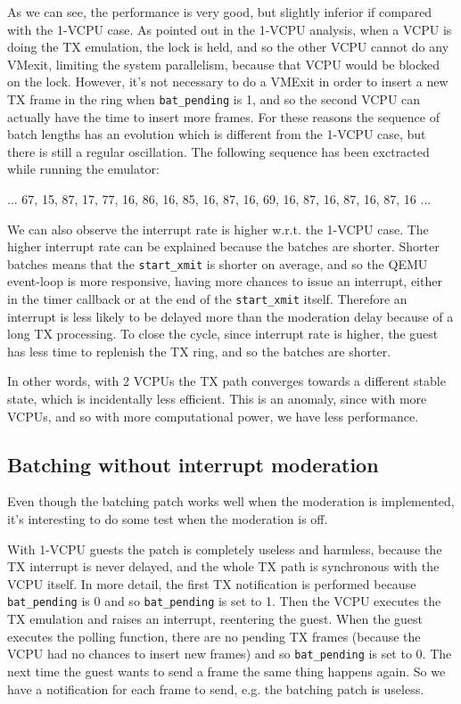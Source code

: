 As we can see, the performance is very good, but slightly inferior if compared with the 1-VCPU case.
As pointed out in the 1-VCPU analysis, when a VCPU is doing the TX emulation, the lock is held, and so the other VCPU cannot do any VMexit,
limiting the system parallelism, because that VCPU would be blocked on the lock. However, it's not necessary to do a VMExit in order to 
insert a new TX frame in the ring when \texttt{bat\_pending} is 1, and so the second VCPU can actually have the time to insert more
frames. For these reasons the sequence of batch lengths has an evolution which is different from the 1-VCPU case, but there is still  a 
regular oscillation. The following sequence has been exctracted while running the emulator:
\begin{center}
... 67, 15, 87, 17, 77, 16, 86, 16, 85, 16, 87, 16, 69, 16, 87, 16, 87, 16, 87, 16 ...
\end{center}
We can also observe the interrupt rate is higher w.r.t. the 1-VCPU case. The higher interrupt rate can be explained because the batches
are shorter. Shorter batches means that the \texttt{start\_xmit} is shorter on average, and so the QEMU event-loop is more responsive,
having more chances to issue an interrupt, either in the timer callback or at the end of the \texttt{start\_xmit} itself. Therefore an
interrupt is less likely to be delayed more than the moderation delay because of a long TX processing.
To close the cycle, since interrupt rate is higher, the guest has less time to replenish the TX ring, and so the batches are shorter.

\vspace{0.5cm}

In other words, with 2 VCPUs the TX path converges towards a different stable state, which is incidentally less efficient. This is an 
anomaly, since with more VCPUs, and so with more computational power, we have less performance.



\subsection{Batching without interrupt moderation}
Even though the batching patch works well when the moderation is implemented, it's interesting to do some test when the moderation is off.

\vspace{0.5cm}

With 1-VCPU guests the patch is completely useless and harmless, because the TX interrupt is never delayed, and the whole TX path is
synchronous with the VCPU itself. In more detail, the first TX notification is performed because \texttt{bat\_pending} is 0 and so
\texttt{bat\_pending} is set to 1. Then the VCPU executes the TX emulation and raises an interrupt, reentering the guest. When
the guest executes the polling function, there are no pending TX frames (because the VCPU had no chances to insert new frames) and so
\texttt{bat\_pending} is set to 0. The next time the guest wants to send a frame the same thing happens again. So we have a notification
for each frame to send, e.g. the batching patch is useless.

